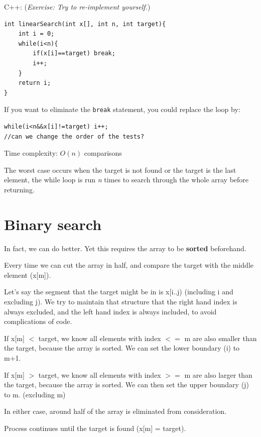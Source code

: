 C++: (\textit{Exercise: Try to re-implement yourself.})
\begin{lstlisting}
int linearSearch(int x[], int n, int target){
    int i = 0;
    while(i<n){
        if(x[i]==target) break;
        i++;
    }
    return i;
}
\end{lstlisting}

If you want to eliminate the \texttt{break} statement, you could replace the loop by:

\begin{lstlisting}
while(i<n&&x[i]!=target) i++;
//can we change the order of the tests?
\end{lstlisting}

Time complexity: $O(n)$ comparisons
\vspace{6mm}

The worst case occurs when the target is not found or the target is the last element, the while loop is run \textit{n} times to search through the whole array before returning.

\pagebreak

\section{Binary search}

In fact, we can do better. Yet this requires the array to be \textbf{sorted} beforehand.

Every time we can cut the array in half, and compare the target with the middle element (x[m]). 
\vspace{6mm}

Let's say the segment that the target might be in is x[i..j) (including i and excluding j). We try to maintain that structure that the right hand index is always excluded, and the left hand index is always included, to avoid complications of code.
\vspace{6mm}

If x[m] $<$ target, we know all elements with index $<=$ m are also smaller than the target, because the array is sorted. We can set the lower boundary (i) to m+1.

If x[m] $>$ target, we know all elements with index $>=$ m are also larger than the target, because the array is sorted. We can then set the upper boundary (j) to m. (excluding m)
\vspace{6mm}

In either case, around half of the array is eliminated from consideration.

Process continues until the target is found (x[m] = target).
\vspace{6mm}

